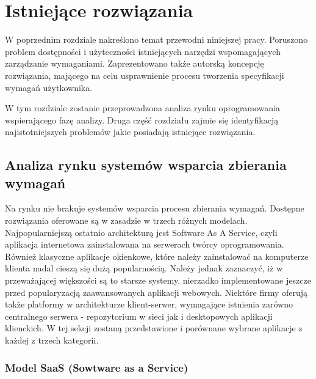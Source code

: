 \chapter{Istniejące rozwiązania}

  W poprzednim rozdziale nakreślono temat przewodni niniejszej pracy. Poruszono problem dostępności i użyteczności istniejących narzędzi wspomagających zarządzanie wymaganiami. Zaprezentowano także autorską koncepcję rozwiązania, mającego na celu usprawnienie procesu tworzenia specyfikacji wymagań użytkownika. 

  W tym rozdziale zostanie przeprowadzona analiza rynku oprogramowania wspierającego fazę analizy. Druga część rozdziału zajmie się identyfikacją najistotniejszych problemów jakie posiadają istniejące rozwiązania. 

  \section{Analiza rynku systemów wsparcia zbierania wymagań}

    Na rynku nie brakuje systemów wsparcia procesu zbierania wymagań. Dostępne rozwiązania oferowane są w zasadzie w trzech różnych modelach. Najpopularniejszą ostatnio architekturą jest Software As A Service, czyli aplikacja internetowa zainstalowana na serwerach twórcy oprogramowania. Również klasyczne aplikacje okienkowe, które należy zainstalować na komputerze klienta nadal cieszą się dużą popularnością. Należy jednak zaznaczyć, iż w przeważającej większości są to starsze systemy, nierzadko implementowane jeszcze przed popularyzacją zaawansowanych aplikacji webowych. Niektóre firmy oferują także platformy w architekturze klient-serwer, wymagające istnienia zarówno centralnego serwera - repozytorium w sieci jak i desktopowych aplikacji klienckich. W tej sekcji zostaną przedstawione i porównane wybrane aplikacje z każdej z trzech kategorii. 

    \subsection{Model SaaS (Sowtware as a Service)}


